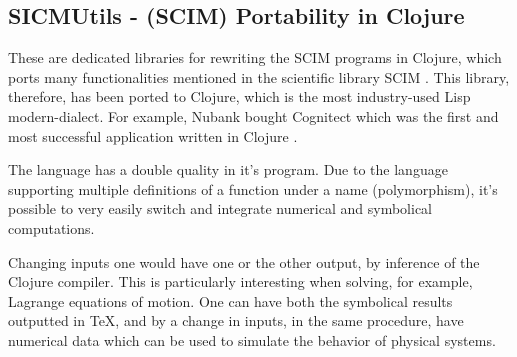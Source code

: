 \documentclass[
12pt,				%
openright,			%
oneside,			%
a4paper,			%
brazil,				%
english,			%
]{abntex2}
\begin{document}
\subsection{SICMUtils - (SCIM) Portability in Clojure}
These are dedicated libraries for rewriting the SCIM programs in
Clojure, which ports many functionalities mentioned in the scientific
library SCIM \cite{sicmutils2016github}. This library, therefore, has
been ported to Clojure, which is the most industry-used Lisp
modern-dialect. For example, Nubank bought Cognitect which was the
first and most successful application written in Clojure \cite{clojure2020}. 

The language has a double quality in it's program. Due to the language
supporting multiple definitions of a function under a name
(polymorphism), it's possible to very easily switch and integrate
numerical and symbolical computations.

Changing inputs one would have one or the other output, by inference
of the Clojure compiler. This is particularly interesting when
solving, for example, Lagrange equations of motion. One can have both
the symbolical results outputted in \TeX{}, and by a change in inputs,
in the same procedure, have numerical data which can be used to
simulate the behavior of physical systems. 

\end{document}
